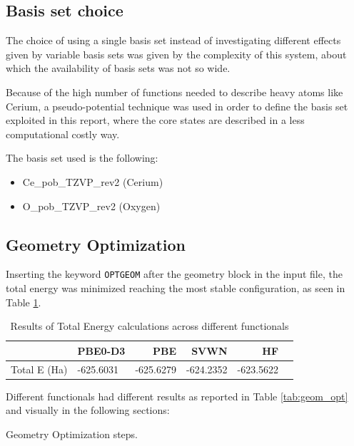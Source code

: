 \documentclass{article}
\begin{document}
\subsection{Basis set choice}

The choice of using a single basis set instead of investigating different effects given by variable basis sets was given by the complexity of this system, about which the availability of basis sets was not so wide.

Because of the high number of functions needed to describe heavy atoms like Cerium, a pseudo-potential technique was used in order to define the basis set exploited in this report, where the core states are described in a less computational costly way.

\vspace{15pt}

\noindent The basis set used is the following:
\begin{itemize}
	\item Ce\_pob\_TZVP\_rev2 (Cerium)
	\item O\_pob\_TZVP\_rev2 (Oxygen)
\end{itemize}

\subsection{Geometry Optimization}

Inserting the keyword \texttt{OPTGEOM} after the geometry block in the input file, the total energy was minimized reaching the most stable configuration, as seen in Table \ref{tab:total_E}.

\begin{table}[H]
	\centering
	\begin{tabular}{llrrrr}
		\toprule
		& PBE0-D3 & PBE & SVWN & HF \\
		\midrule
		Total E (Ha) & -625.6031 & -625.6279 & -624.2352 & -623.5622 \\
	\end{tabular}	
	\caption{Results of Total Energy calculations across different functionals}
	\label{tab:total_E}
\end{table}

\noindent Different functionals had different results as reported in Table \ref{tab:geom_opt} and visually in the following sections:

\begin{table}[H]
    \centering
    
    \caption{Geometry Optimization steps.}
    \label{tab:geom_opt}
\end{table}
\end{document}

